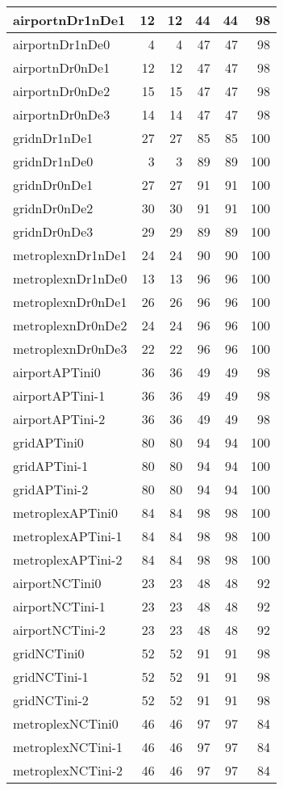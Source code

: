 \documentclass[../../../thesis.tex]{subfiles}
\begin{document}
\begin{longtable}{|l|r|r|r|r|r|}
\endlastfoot
airportnDr1nDe1 & 12 & 12 & 44 & 44 & 98 \\ \hline
airportnDr1nDe0 & 4 & 4 & 47 & 47 & 98 \\ \hline
airportnDr0nDe1 & 12 & 12 & 47 & 47 & 98 \\ \hline
airportnDr0nDe2 & 15 & 15 & 47 & 47 & 98 \\ \hline
airportnDr0nDe3 & 14 & 14 & 47 & 47 & 98 \\ \hline
gridnDr1nDe1 & 27 & 27 & 85 & 85 & 100 \\ \hline
gridnDr1nDe0 & 3 & 3 & 89 & 89 & 100 \\ \hline
gridnDr0nDe1 & 27 & 27 & 91 & 91 & 100 \\ \hline
gridnDr0nDe2 & 30 & 30 & 91 & 91 & 100 \\ \hline
gridnDr0nDe3 & 29 & 29 & 89 & 89 & 100 \\ \hline
metroplexnDr1nDe1 & 24 & 24 & 90 & 90 & 100 \\ \hline
metroplexnDr1nDe0 & 13 & 13 & 96 & 96 & 100 \\ \hline
metroplexnDr0nDe1 & 26 & 26 & 96 & 96 & 100 \\ \hline
metroplexnDr0nDe2 & 24 & 24 & 96 & 96 & 100 \\ \hline
metroplexnDr0nDe3 & 22 & 22 & 96 & 96 & 100 \\ \hline
airportAPTini0 & 36 & 36 & 49 & 49 & 98 \\ \hline
airportAPTini-1 & 36 & 36 & 49 & 49 & 98 \\ \hline
airportAPTini-2 & 36 & 36 & 49 & 49 & 98 \\ \hline
gridAPTini0 & 80 & 80 & 94 & 94 & 100 \\ \hline
gridAPTini-1 & 80 & 80 & 94 & 94 & 100 \\ \hline
gridAPTini-2 & 80 & 80 & 94 & 94 & 100 \\ \hline
metroplexAPTini0 & 84 & 84 & 98 & 98 & 100 \\ \hline
metroplexAPTini-1 & 84 & 84 & 98 & 98 & 100 \\ \hline
metroplexAPTini-2 & 84 & 84 & 98 & 98 & 100 \\ \hline
airportNCTini0 & 23 & 23 & 48 & 48 & 92 \\ \hline
airportNCTini-1 & 23 & 23 & 48 & 48 & 92 \\ \hline
airportNCTini-2 & 23 & 23 & 48 & 48 & 92 \\ \hline
gridNCTini0 & 52 & 52 & 91 & 91 & 98 \\ \hline
gridNCTini-1 & 52 & 52 & 91 & 91 & 98 \\ \hline
gridNCTini-2 & 52 & 52 & 91 & 91 & 98 \\ \hline
metroplexNCTini0 & 46 & 46 & 97 & 97 & 84 \\ \hline
metroplexNCTini-1 & 46 & 46 & 97 & 97 & 84 \\ \hline
metroplexNCTini-2 & 46 & 46 & 97 & 97 & 84 \\ \hline
\end{longtable}
\end{document}
